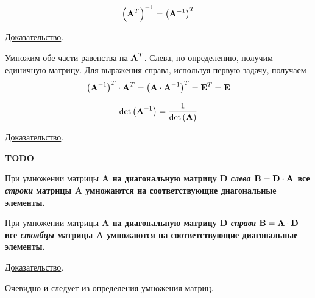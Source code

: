 \begin{theorem}
    \begin{equation*}
        \left( \bf{A}^T \right)^{-1} = \left( \bf{A}^{-1} \right)^T
    \end{equation*}

    \underline{Доказательство}.
    \vspace{5pt}

    Умножим обе части равенства на $\displaystyle \bf{A}^T$. Слева, по определению,
    получим единичную матрицу. Для выражения справа, используя первую задачу, получаем
    \begin{equation*}
        \left( \bf{A}^{-1} \right)^T \cdot \bf{A}^T = \left( \bf{A} \cdot \bf{A}^{-1} \right)^T = \bf{E}^T = \bf{E}
    \end{equation*}
\end{theorem}

\begin{theorem}
    \begin{equation*}
        \det \left( \bf{A}^{-1} \right) = \frac{1}{\det\left( \bf{A} \right)}
    \end{equation*}

    \underline{Доказательство}.
    \vspace{5pt}

    \bf{TODO}
\end{theorem}

\begin{theorem}
    При умножении матрицы \bf{A} на диагональную матрицу \bf{D} \emph{слева} $\bf{B} = \bf{D} \cdot \bf{A}$
    все \emph{строки} матрицы \bf{A} умножаются на соответствующие диагональные элементы.

    При умножении матрицы \bf{A} на диагональную матрицу \bf{D} \emph{справа} $\bf{B} = \bf{A} \cdot \bf{D}$
    все \emph{столбцы} матрицы \bf{A} умножаются на соответствующие диагональные элементы.

    \underline{Доказательство}.
    \vspace{5pt}

    Очевидно и следует из определения умножения матриц.
\end{theorem}

